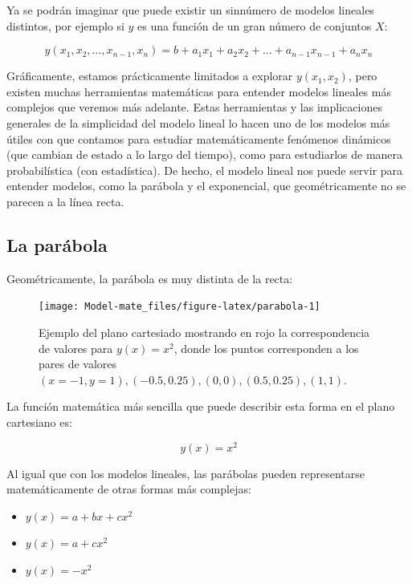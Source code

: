 \documentclass[
]{book}
\providecommand{\tightlist}{%
  \setlength{\itemsep}{0pt}\setlength{\parskip}{0pt}}
\begin{document}
Ya se podrán imaginar que puede existir un sinnúmero de modelos lineales distintos, por ejemplo si \(y\) es una función de un gran número de conjuntos \(X\):

\begin{equation}
y(x_1, x_2, \dots, x_{n-1}, x_n) = b + a_1 x_1 + a_2 x_2 + \dots + a_{n-1} x_{n-1} + a_n x_n
\end{equation}

Gráficamente, estamos prácticamente limitados a explorar \(y(x_1, x_2)\), pero existen muchas herramientas matemáticas para entender modelos lineales más complejos que veremos más adelante. Estas herramientas y las implicaciones generales de la simplicidad del modelo lineal lo hacen uno de los modelos más útiles con que contamos para estudiar matemáticamente fenómenos dinámicos (que cambian de estado a lo largo del tiempo), como para estudiarlos de manera probabilística (con estadística). De hecho, el modelo lineal nos puede servir para entender modelos, como la parábola y el exponencial, que geométricamente no se parecen a la línea recta.

\hypertarget{la-paruxe1bola}{%
\subsection{La parábola}\label{la-paruxe1bola}}

Geométricamente, la parábola es muy distinta de la recta:

\begin{figure}

{\centering \texttt{[image: Model-mate\_files/figure-latex/parabola-1]} 

}

\caption{Ejemplo del plano cartesiado mostrando en rojo la correspondencia de valores para $y(x) = x^2$, donde los puntos corresponden a los pares de valores $(x = -1, y = 1), (-0.5, 0.25), (0, 0), (0.5, 0.25), (1, 1)$.}\label{fig:parabola}
\end{figure}

La función matemática más sencilla que puede describir esta forma en el plano cartesiano es:

\begin{equation}
    y(x) = x^2
\end{equation}

Al igual que con los modelos lineales, las parábolas pueden representarse matemáticamente de otras formas más complejas:

\begin{itemize}
\tightlist
\item
  \(y(x) = a + bx + cx^2\)
\item
  \(y(x) = a + cx^2\)
\item
  \(y(x) = -x^2\)
\end{itemize}
\end{document}

